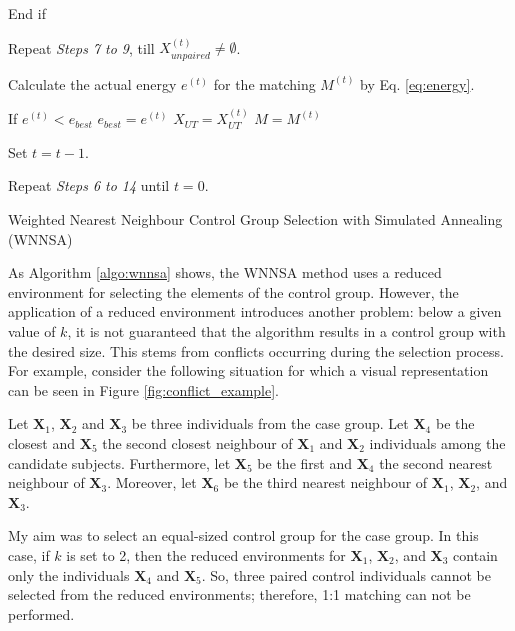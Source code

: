 \begin{algorithm}
			\text{\quad}\text{\quad}End if
													
			Repeat \textit{Steps 7 to 9}, till $X_{unpaired}^{(t)}\neq\emptyset$.
													
			Calculate the actual energy $e^{(t)}$ for the matching $M^{(t)}$ by Eq. \ref{eq:energy}.
													
			If $e^{(t)}<e_{best}$
			\linebreak
			\text{\quad}
			$e_{best}=e^{(t)}$
			\linebreak
			\text{\quad}
			$X_{UT}=X_{UT}^{(t)}$
			\linebreak
			\text{\quad}
			$M=M^{(t)}$
													
			Set $t=t-1$.
													
			Repeat \textit{Steps 6 to 14} until  $t=0$.
													
			\caption{Weighted Nearest Neighbour Control Group Selection with Simulated Annealing (WNNSA)}
			\label{algo:wnnsa}
		\end{algorithm}
								
		As Algorithm \ref{algo:wnnsa} shows, the WNNSA method uses a reduced environment for selecting the elements of the control group. However, the application of a reduced environment introduces another problem: below a given value of $k$, it is not guaranteed that the algorithm results in a control group with the desired size. This stems from conflicts occurring during the selection process. For example, consider the following situation for which a visual representation can be seen in Figure \ref{fig:conflict_example}.
								
		Let $\textbf{X}_1$, $\textbf{X}_2$ and $\textbf{X}_3$ be three individuals from the case group. Let $\textbf{X}_4$ be the closest and $\textbf{X}_5$ the second closest neighbour of $\textbf{X}_1$ and $\textbf{X}_2$ individuals among the candidate subjects. Furthermore, let $\textbf{X}_5$ be the first and $\textbf{X}_4$ the second nearest neighbour of $\textbf{X}_3$. Moreover, let $\textbf{X}_6$ be the third nearest neighbour of $\textbf{X}_1$, $\textbf{X}_2$, and $\textbf{X}_3$.
								
		My aim was to select an equal-sized control group for the case group. In this case, if $k$ is set to 2, then the reduced environments for $\textbf{X}_1$, $\textbf{X}_2$, and $\textbf{X}_3$ contain only the individuals $\textbf{X}_4$ and $\textbf{X}_5$. So, three paired control individuals cannot be selected from the reduced environments; therefore, 1:1 matching can not be performed.
								
